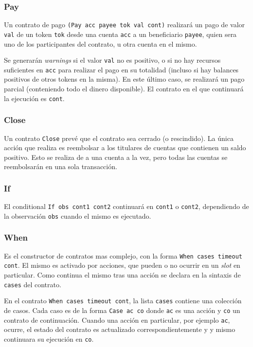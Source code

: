 \documentclass[12pt]{book}
\begin{document}
\subsubsection{Pay}
Un contrato de pago \texttt{(Pay acc payee tok val cont)} realizará un pago de valor \texttt{val} de un token \texttt{tok} desde una cuenta \texttt{acc} a un beneficiario \texttt{payee}, quien sera uno de los participantes del contrato, u otra cuenta en el mismo.

Se generarán \textit{warnings} si el valor \texttt{val} no es positivo, o si no hay recursos suficientes en \texttt{acc} para realizar el pago en su totalidad (incluso si hay balances positivos de otros tokens en la misma). En este último caso, se realizará un pago parcial (conteniendo todo el dinero disponible). El contrato en el que continuará la ejecución es \texttt{cont}.

\subsubsection{Close}\label{sec:Close}

Un contrato \texttt{Close} prevé que el contrato sea cerrado (o rescindido). La única acción que realiza es reembolsar a los titulares de cuentas que contienen un saldo positivo. Esto se realiza de a una cuenta a la vez, pero todas las cuentas se reembolsarán en una sola transacción.

\subsubsection{If}
El conditional \texttt{If obs cont1 cont2} continuará en \texttt{cont1} o \texttt{cont2}, dependiendo de la observación \texttt{obs} cuando el mismo es ejecutado.

\subsubsection{When}
Es el constructor de contratos mas complejo, con la forma \texttt{When cases timeout cont}. El mismo es activado por acciones, que pueden o no ocurrir en un \textit{slot} en particular. Como continua el mismo tras una acción se declara en la sintaxis de \texttt{cases} del contrato.

En el contrato \texttt{When cases timeout cont}, la lista \texttt{cases} contiene una colección de casos. Cada caso es de la forma \texttt{Case ac co} donde \texttt{ac} es una acción y \texttt{co} un contrato de continuación. Cuando una acción en particular, por ejemplo \texttt{ac}, ocurre, el estado del contrato es actualizado correspondientemente y y mismo continuara su ejecución en \texttt{co}.
\end{document}
